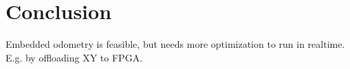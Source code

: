 \chapter{Conclusion}
\label{sec:conclusion}

Embedded odometry is feasible, but needs more optimization to run in realtime. E.g. by offloading XY to FPGA.
